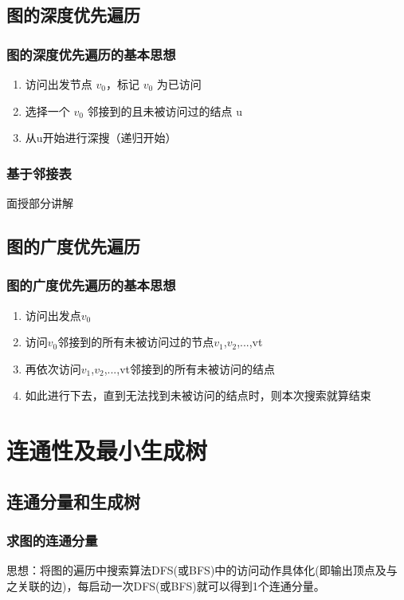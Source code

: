 \documentclass[AutoFakeBold]{LZUThesis2007}
\begin{document}
		\subsection{图的深度优先遍历}
			\subsubsection{图的深度优先遍历的基本思想}
			\begin{enumerate}
				\item 访问出发节点 $v_{0}$，标记 $v_{0}$ 为已访问
				\item 选择一个 $v_{0}$ 邻接到的且未被访问过的结点 u
				\item 从u开始进行深搜（递归开始）
			\end{enumerate}
			\subsubsection{基于邻接表}
			面授部分讲解

		\subsection{图的广度优先遍历}
			\subsubsection{图的广度优先遍历的基本思想}
			\begin{enumerate}
				\item 访问出发点$v_{0}$
				\item 访问$v_{0}$邻接到的所有未被访问过的节点$v_{1}$,$v_{2}$,...,vt
				\item 再依次访问$v_{1}$,$v_{2}$,...,vt邻接到的所有未被访问的结点
				\item 如此进行下去，直到无法找到未被访问的结点时，则本次搜索就算结束
			\end{enumerate}
	\section{连通性及最小生成树}
		\subsection{连通分量和生成树}
			\subsubsection{求图的连通分量}
			思想：将图的遍历中搜索算法DFS(或BFS)中的访问动作具体化(即输出顶点及与之关联的边)，每启动一次DFS(或BFS)就可以得到1个连通分量。
\end{document}
